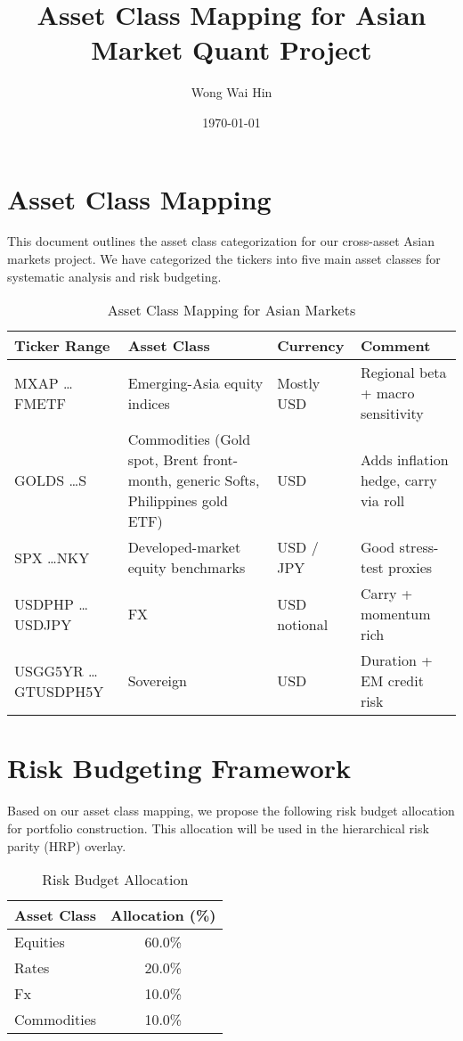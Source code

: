 \documentclass{article}
\title{Asset Class Mapping for Asian Market Quant Project}
\author{Wong Wai Hin}
\date{\today}
\begin{document}
\maketitle

\section{Asset Class Mapping}

This document outlines the asset class categorization for our cross-asset Asian markets project. 
We have categorized the tickers into five main asset classes for systematic analysis and risk budgeting.


\begin{table}[h!]
\centering
\caption{Asset Class Mapping for Asian Markets}
\label{tab:asset_class_mapping}
\begin{tabularx}{\textwidth}{|l|X|l|X|}
\hline
\textbf{Ticker Range} & \textbf{Asset Class} & \textbf{Currency} & \textbf{Comment} \\
\hline
MXAP \ldots FMETF & Emerging-Asia equity indices & Mostly USD & Regional beta + macro sensitivity \\
\hline
GOLDS \ldots S & Commodities (Gold spot, Brent front-month, generic Softs, Philippines gold ETF) & USD & Adds inflation hedge, carry via roll \\
\hline
SPX \ldots NKY & Developed-market equity benchmarks & USD / JPY & Good stress-test proxies \\
\hline
USDPHP \ldots USDJPY & FX & USD notional & Carry + momentum rich \\
\hline
USGG5YR \ldots GTUSDPH5Y & Sovereign & USD & Duration + EM credit risk \\
\hline
\end{tabularx}
\end{table}

\section{Risk Budgeting Framework}

Based on our asset class mapping, we propose the following risk budget allocation for portfolio construction.
This allocation will be used in the hierarchical risk parity (HRP) overlay.


\begin{table}[h!]
\centering
\caption{Risk Budget Allocation}
\label{tab:risk_budget}
\begin{tabular}{|l|c|}
\hline
\textbf{Asset Class} & \textbf{Allocation (\%)} \\
\hline
Equities & 60.0\% \\
\hline
Rates & 20.0\% \\
\hline
Fx & 10.0\% \\
\hline
Commodities & 10.0\% \\
\hline
\end{tabular}
\end{table}
\end{document}
